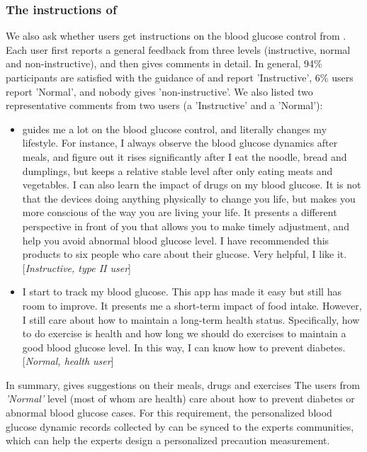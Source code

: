 {\subsubsection{The instructions of \sysname}
We also ask whether users get instructions on the blood glucose control from \sysname. Each user first reports a general feedback from three
levels (\ie instructive, normal and non-instructive), and then gives comments in detail.
In general, 94\% participants are satisfied with the guidance of \sysname and report 'Instructive', 6\% users report 'Normal', and nobody gives
'non-instructive'.
We also listed two representative comments from two users (a 'Instructive' and a 'Normal'):

\begin{itemize}
  \item  \sysname guides me a lot on the blood glucose control, and literally changes my lifestyle. For instance, I always observe the blood glucose dynamics after meals, and figure out it rises significantly after I eat the noodle, bread and dumplings, but keeps a relative stable level after only eating meats and vegetables. I can also learn the impact of drugs on my blood glucose.
      It is not that the devices doing anything physically to change you life, but makes you more conscious of the way you are living your life. It presents a different perspective in front of you that allows you to make timely adjustment, and  help you avoid abnormal blood glucose level. I have recommended this products to six people who care about their glucose. Very  helpful, I like it.  [\emph{Instructive, type II user}]
  \item  I start to track my blood glucose. This app has made it easy but still has room to improve.
        It presents me a short-term impact of food intake.  However, I still care about how to maintain a long-term health status. Specifically,
        how to do exercise is health and how long we should do exercises to maintain a good blood glucose level. In this way, I can know how to prevent diabetes. [\emph{Normal, health user}]
\end{itemize}

In summary, \sysname gives suggestions on their meals, drugs and exercises \etc The users from \emph{'Normal'} level (most of whom are health) care about how to prevent diabetes or abnormal blood glucose cases. For this requirement, the personalized blood glucose dynamic records collected by \sysname can be synced to the experts communities, which can help the experts design a personalized precaution measurement.

}
